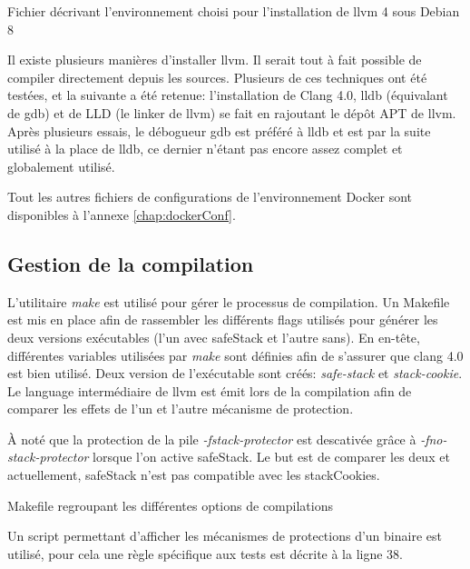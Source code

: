 \begin{listing}
	\caption{Fichier décrivant l'environnement choisi pour l'installation de \gls{llvm} 4 sous Debian 8}
	\label{lst:dockerfile}
\end{listing}

Il existe plusieurs manières d'installer \gls{llvm}. Il serait tout à fait possible de compiler directement depuis les sources. Plusieurs de ces techniques ont été testées, et la suivante a été retenue: l'installation de Clang 4.0, \gls{lldb} (équivalant de \gls{gdb}) et de LLD (le \og linker \fg de \gls{llvm}) se fait en rajoutant le dépôt APT de \gls{llvm}. Après plusieurs essais, le débogueur \gls{gdb} est préféré à \gls{lldb} et est par la suite utilisé à la place de \gls{lldb}, ce dernier n'étant pas encore assez complet et globalement utilisé.

Tout les autres fichiers de configurations de l'environnement Docker sont disponibles à l'annexe \ref{chap:dockerConf}.

\subsection{Gestion de la compilation}

L'utilitaire \textit{make} est utilisé pour gérer le processus de compilation. Un Makefile est mis en place afin de rassembler les différents \og flags \fg utilisés pour générer les deux versions exécutables (l'un avec \gls{safeStack} et l'autre sans). En en-tête, différentes variables utilisées par \textit{make} sont définies afin de s'assurer que \gls{clang} 4.0 est bien utilisé. Deux version de l'exécutable sont créés: \textit{safe-stack} et \textit{stack-cookie}. Le language intermédiaire de \gls{llvm} est émit lors de la compilation afin de comparer les effets de l'un et l'autre mécanisme de protection.

À noté que la protection de la pile \textit{-fstack-protector} est descativée grâce à \textit{-fno-stack-protector} lorsque l'on active \gls{safeStack}. Le but est de comparer les deux et actuellement, \gls{safeStack} n'est pas compatible avec les \gls{stackCookies}.

\begin{listing}
	\caption{Makefile regroupant les différentes options de compilations}
	\label{lst:defaultMakefile}
\end{listing}

Un script permettant d'afficher les mécanismes de protections d'un binaire est utilisé, pour cela une règle spécifique aux tests est décrite à la ligne 38.

